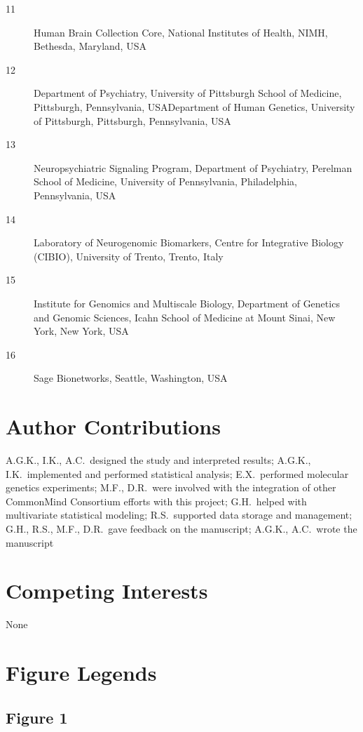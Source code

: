 \documentclass[letterpaper]{article}
\begin{document}
\begin{description}
\item[11] Human Brain Collection Core, National Institutes of Health, NIMH, Bethesda, Maryland, USA
\item[12] Department of Psychiatry, University of Pittsburgh School of
Medicine, Pittsburgh, Pennsylvania, USADepartment of Human Genetics,
University of Pittsburgh, Pittsburgh, Pennsylvania, USA
\item[13] Neuropsychiatric Signaling Program, Department of Psychiatry,
Perelman School of Medicine, University of Pennsylvania, Philadelphia,
Pennsylvania, USA
\item[14] Laboratory of Neurogenomic Biomarkers, Centre  for Integrative
Biology (CIBIO), University of Trento, Trento, Italy
\item[15] Institute for Genomics and Multiscale Biology, Department of
Genetics and Genomic Sciences, Icahn School of Medicine at Mount Sinai, New
York, New York, USA
\item[16] Sage Bionetworks, Seattle, Washington, USA

\end{description}

\section*{Author Contributions}

A.G.K., I.K., A.C.~designed the study and interpreted results;  A.G.K.,
I.K.~implemented and performed statistical analysis; E.X.~performed molecular
genetics experiments; M.F., D.R.~were involved with the integration of other
CommonMind Consortium efforts with this project; G.H.~helped with multivariate
statistical modeling; R.S.~supported data storage and management; G.H., R.S.,
M.F., D.R.~gave feedback on the manuscript; A.G.K., A.C.~wrote the manuscript

\section*{Competing Interests}

None

\section*{Figure Legends}

\subsection*{Figure 1}
\end{document}
